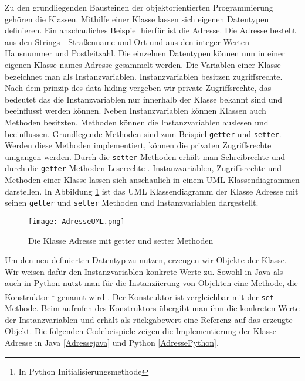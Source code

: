 Zu den grundliegenden Bausteinen der objektorientierten Programmierung gehören die Klassen. Mithilfe einer Klasse lassen sich eigenen Datentypen definieren. Ein anschauliches Beispiel hierfür ist die Adresse. Die Adresse besteht aus den Strings - Straßenname und Ort und aus den integer Werten - Hausnummer und Postleitzahl. Die einzelnen Datentypen können nun in einer eigenen Klasse names Adresse gesammelt werden. Die Variablen einer Klasse bezeichnet man als Instanzvariablen. 
Instanzvariablen besitzen zugriffsrechte. Nach dem prinzip des data hiding vergeben wir private Zugriffsrechte, das bedeutet das die Instanzvariablen nur innerhalb der Klasse bekannt sind und beeinflusst werden können.
Neben Instanzvariablen können Klassen auch Methoden besitzten. Methoden können die Instanzvariablen auslesen und beeinflussen. Grundlegende Methoden sind zum Beispiel \texttt{getter} und \texttt{setter}. Werden diese Methoden implementiert, können die privaten Zugriffsrechte umgangen werden. Durch die \texttt{setter} Methoden erhält man Schreibrechte und durch die \texttt{getter} Methoden Leserechte \cite{JavaRatz}.
Instanzvariablen, Zugriffsrechte und Methoden einer Klasse lassen sich anschaulich in einem UML Klassendiagrammen darstellen. In Abbildung \ref{img:AdresseUML} ist das UML Klassendiagramm der Klasse Adresse mit seinen \texttt{getter} und \texttt{setter} Methoden und Instanzvariablen dargestellt. 

\begin{figure}[!htb]
    \centering
    \texttt{[image: AdresseUML.png]}
    \caption{Die Klasse Adresse mit getter und setter Methoden}
    \label{img:AdresseUML}
\end{figure}

Um den neu definierten Datentyp zu nutzen, erzeugen wir Objekte der Klasse. Wir weisen dafür den Instanzvariablen konkrete Werte zu. Sowohl in Java als auch in Python nutzt man für die Instanziierung von Objekten eine Methode, die Konstruktor \footnote{In Python  Initialisierungsmethode} genannt wird . Der Konstruktor ist vergleichbar mit der \texttt{set} Methode. Beim aufrufen des Konstruktors übergibt man ihm die konkreten Werte der Instanzvariablen und erhält als rückgabewert eine Referenz auf das erzeugte Objekt. Die folgenden Codebeispiele zeigen die Implementierung der Klasse Adresse in Java \ref{Adressejava} und Python \ref{AdressePython}.

